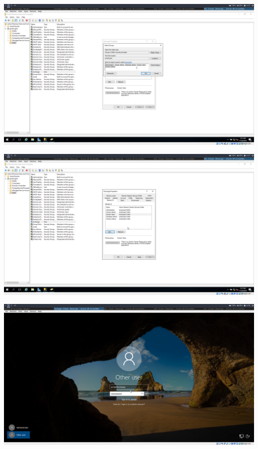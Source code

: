 \documentclass[a4paper]{article}
\begin{document}
	\begin{center}
	\includegraphics[width=15cm]{Pictures/Exchange/user/1543413451.png}
\end{center}
	\begin{center}
	\includegraphics[width=15cm]{Pictures/Exchange/user/1543413459.png}
\end{center}
	\begin{center}
	\includegraphics[width=15cm]{Pictures/Exchange/user/1543413480.png}
\end{center}
\end{document}
